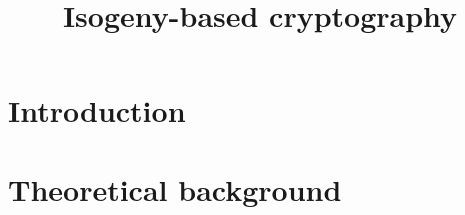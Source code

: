 \documentclass[12pt]{article}
\title{Isogeny-based cryptography}
\author{}
\date{}
\begin{document}
\maketitle
\renewcommand{\contentsname}{Table of content}
\tableofcontents
\newpage

%

\section{Introduction}


\section{Theoretical background}




%
\end{document}
